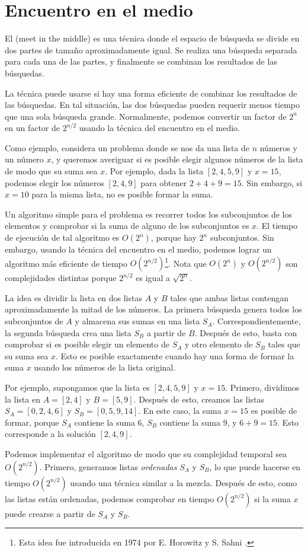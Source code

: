 \section{Encuentro en el medio}


El  (meet in the middle) es una técnica
donde el espacio de búsqueda se divide en
dos partes de tamaño aproximadamente igual.
Se realiza una búsqueda separada
para cada una de las partes,
y finalmente se combinan los resultados de las búsquedas.

La técnica puede usarse
si hay una forma eficiente de combinar los
resultados de las búsquedas.
En tal situación, las dos búsquedas pueden requerir menos
tiempo que una sola búsqueda grande.
Normalmente, podemos convertir un factor de $2^n$
en un factor de $2^{n/2}$ usando la técnica del encuentro
en el medio.

Como ejemplo, considera un problema donde
se nos da una lista de $n$ números y
un número $x$,
y queremos averiguar si es posible
elegir algunos números de la lista de modo que
su suma sea $x$.
Por ejemplo, dada la lista $[2,4,5,9]$ y $x=15$,
podemos elegir los números $[2,4,9]$ para obtener $2+4+9=15$.
Sin embargo, si $x=10$ para la misma lista,
no es posible formar la suma.

Un algoritmo simple para el problema es
recorrer todos los subconjuntos de los elementos y
comprobar si la suma de alguno de los subconjuntos es $x$.
El tiempo de ejecución de tal algoritmo es $O(2^n)$,
porque hay $2^n$ subconjuntos.
Sin embargo, usando la técnica del encuentro en el medio,
podemos lograr un algoritmo más eficiente de tiempo $O(2^{n/2})$\footnote{Esta
idea fue introducida en 1974 por E. Horowitz y S. Sahni \cite{hor74}.}.
Nota que $O(2^n)$ y $O(2^{n/2})$ son complejidades
distintas porque $2^{n/2}$ es igual a $\sqrt{2^n}$.

La idea es dividir la lista en
dos listas $A$ y $B$ tales que ambas
listas contengan aproximadamente la mitad de los números.
La primera búsqueda genera todos los subconjuntos
de $A$ y almacena sus sumas en una lista $S_A$.
Correspondientemente, la segunda búsqueda crea
una lista $S_B$ a partir de $B$.
Después de esto, basta con comprobar si es posible
elegir un elemento de $S_A$ y otro
elemento de $S_B$ tales que su suma sea $x$.
Esto es posible exactamente cuando hay una forma de
formar la suma $x$ usando los números de la lista original.

Por ejemplo, supongamos que la lista es $[2,4,5,9]$ y $x=15$.
Primero, dividimos la lista en $A=[2,4]$ y $B=[5,9]$.
Después de esto, creamos las listas
$S_A=[0,2,4,6]$ y $S_B=[0,5,9,14]$.
En este caso, la suma $x=15$ es posible de formar,
porque $S_A$ contiene la suma $6$,
$S_B$ contiene la suma $9$, y $6+9=15$.
Esto corresponde a la solución $[2,4,9]$.

Podemos implementar el algoritmo de modo que
su complejidad temporal sea $O(2^{n/2})$.
Primero, generamos listas \emph{ordenadas} $S_A$ y $S_B$,
lo que puede hacerse en tiempo $O(2^{n/2})$ usando una técnica similar a la mezcla.
Después de esto, como las listas están ordenadas,
podemos comprobar en tiempo $O(2^{n/2})$ si
la suma $x$ puede crearse a partir de $S_A$ y $S_B$.
